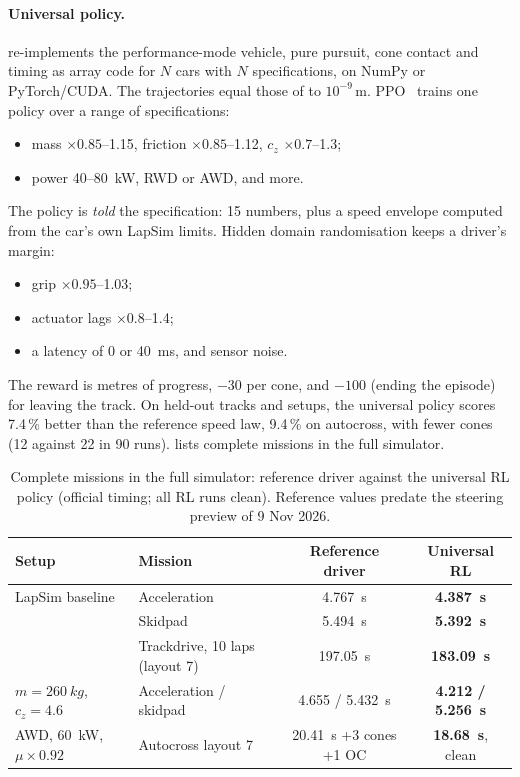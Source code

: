 \documentclass[11pt]{article}
\begin{document}
\paragraph{Universal policy.}  re-implements the performance-mode vehicle, pure pursuit, cone
contact and timing as array code for $N$ cars with $N$ specifications, on NumPy or PyTorch/CUDA. The trajectories
equal those of  to $10^{-9}$\,m. PPO~\cite{schulman2017,schulman2016} trains one policy over a range of
specifications:
\begin{itemize}
  \item mass $\times0.85$--1.15, friction $\times0.85$--1.12, $c_z$ $\times0.7$--1.3;
  \item power 40--\SI{80}{kW}, RWD or AWD, and more.
\end{itemize}
The policy is \emph{told} the specification: 15 numbers, plus a speed envelope computed from the car's own LapSim
limits. Hidden domain randomisation keeps a driver's margin:
\begin{itemize}
  \item grip $\times0.95$--1.03;
  \item actuator lags $\times0.8$--1.4;
  \item a latency of 0 or \SI{40}{ms}, and sensor noise.
\end{itemize}
The reward is metres of progress, $-30$ per cone, and $-100$ (ending the episode) for leaving the track. On held-out
tracks and setups, the universal policy scores 7.4\,\% better than the reference speed law, 9.4\,\% on autocross,
with fewer cones (12 against 22 in 90 runs).  lists complete missions in the full simulator.

\begin{table}[t]
\centering\small
\caption{Complete missions in the full simulator: reference driver against the universal RL policy (official
timing; all RL runs clean). Reference values predate the steering preview of 9 Nov 2026.}
\label{tab:rl}
\begin{tabular}{@{}llcc@{}}
\toprule
Setup & Mission & Reference driver & Universal RL\\
\midrule
LapSim baseline & Acceleration & \SI{4.767}{s} & \textbf{\SI{4.387}{s}}\\
& Skidpad & \SI{5.494}{s} & \textbf{\SI{5.392}{s}}\\
& Trackdrive, 10 laps (layout 7) & \SI{197.05}{s} & \textbf{\SI{183.09}{s}}\\
$m=\SI{260}{kg}$, $c_z=4.6$ & Acceleration / skidpad & 4.655 / \SI{5.432}{s} & \textbf{4.212 / \SI{5.256}{s}}\\
AWD, \SI{60}{kW}, $\mu\times0.92$ & Autocross layout 7 & \SI{20.41}{s} +3 cones +1 OC & \textbf{\SI{18.68}{s}}, clean\\
\bottomrule
\end{tabular}
\end{table}
\end{document}
